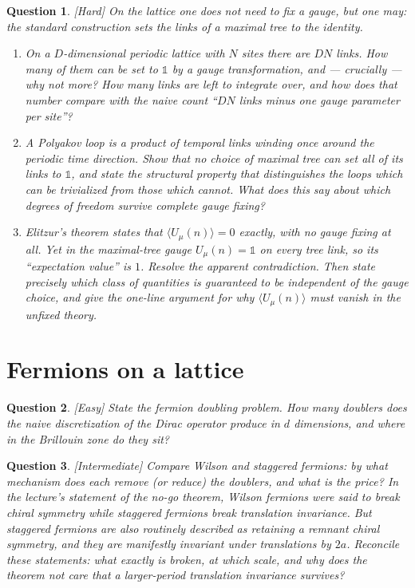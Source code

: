 \documentclass[11pt]{article}
\newcommand{\diff}[1]{\textcolor{blue!60!black}{\footnotesize\textsf{[#1]}}\quad}
\newtheorem{question}{Question}
\begin{document}
\begin{question}
\diff{Hard} On the lattice one does not need to fix a gauge, but one may: the standard construction sets the links of a \emph{maximal tree} to the identity.
\begin{enumerate}[label=(\roman*), leftmargin=*]
  \item On a $D$-dimensional periodic lattice with $N$ sites there are $DN$ links. How many of them can be set to $\mathbb{1}$ by a gauge transformation, and --- crucially --- why not more? How many links are left to integrate over, and how does that number compare with the naive count ``$DN$ links minus one gauge parameter per site''?
  \item A Polyakov loop is a product of temporal links winding once around the periodic time direction. Show that no choice of maximal tree can set \emph{all} of its links to $\mathbb{1}$, and state the structural property that distinguishes the loops which can be trivialized from those which cannot. What does this say about which degrees of freedom survive complete gauge fixing?
  \item Elitzur's theorem states that $\langle U_\mu(n)\rangle = 0$ exactly, with no gauge fixing at all. Yet in the maximal-tree gauge $U_\mu(n)=\mathbb{1}$ on every tree link, so its ``expectation value'' is $1$. Resolve the apparent contradiction. Then state precisely which class of quantities is guaranteed to be independent of the gauge choice, and give the one-line argument for why $\langle U_\mu(n)\rangle$ must vanish in the unfixed theory.
\end{enumerate}
\end{question}

\section{Fermions on a lattice}

\begin{question}
\diff{Easy} State the fermion doubling problem. How many doublers does the naive discretization of the Dirac operator produce in $d$ dimensions, and where in the Brillouin zone do they sit?
\end{question}

\begin{question}
\diff{Intermediate} Compare Wilson and staggered fermions: by what mechanism does each remove (or reduce) the doublers, and what is the price? In the lecture's statement of the no-go theorem, Wilson fermions were said to break \emph{chiral symmetry} while staggered fermions break \emph{translation invariance}. But staggered fermions are also routinely described as retaining a remnant chiral symmetry, and they are manifestly invariant under translations by $2a$. Reconcile these statements: what exactly is broken, at which scale, and why does the theorem not care that a larger-period translation invariance survives?
\end{question}
\end{document}
